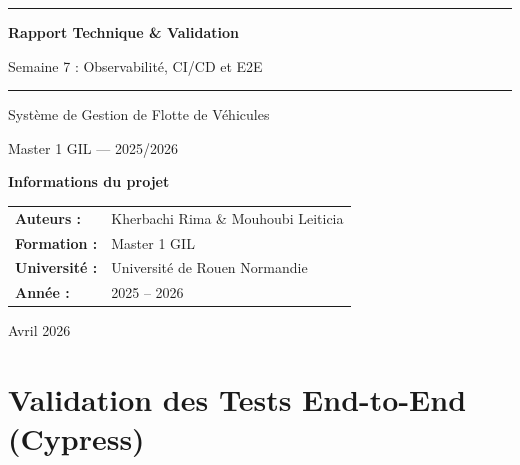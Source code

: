 \documentclass[12pt,a4paper]{report}
\begin{document}
\begin{titlepage}
\centering
\vspace*{2cm}

{\color{primary}\rule{\linewidth}{1pt}}
\vspace{0.5cm}

{\Huge\bfseries\color{primary} Rapport Technique \& Validation\par}
\vspace{0.4cm}
{\LARGE\color{secondary} Semaine 7 : Observabilité, CI/CD et E2E \par}
\vspace{0.3cm}

\vspace{0.5cm}
{\color{primary}\rule{\linewidth}{1pt}}

\vspace{2cm}

{\Large Système de Gestion de Flotte de Véhicules\par}
\vspace{1cm}
{\large Master 1 GIL --- 2025/2026\par}
\vspace{0.5cm}

\begin{tcolorbox}[colback=lightblue, colframe=secondary, width=0.9\textwidth]
    \centering
    \textbf{Informations du projet}\\[0.5em]
    \begin{tabular}{ll}
      \textbf{Auteurs :} & Kherbachi Rima \& Mouhoubi Leiticia\\
      \textbf{Formation :} & Master 1 GIL \\
      \textbf{Université :} & Université de Rouen Normandie \\
      \textbf{Année :} & 2025 -- 2026 \\
    \end{tabular}
  \end{tcolorbox}
\vspace{1cm}
{\large Avril 2026\par}

\vfill
\end{titlepage}

\newpage
\tableofcontents
\newpage

\chapter{Validation des Tests End-to-End (Cypress)}
\end{document}
